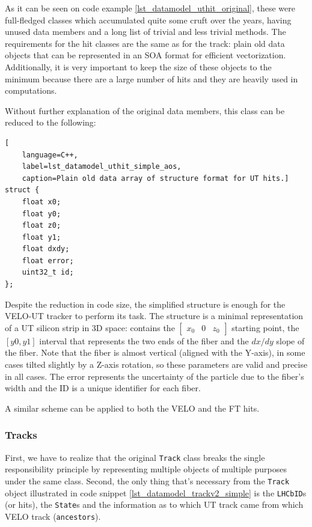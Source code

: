 \documentclass[12pt]{article}
\newcommand{\code}[1]{\texttt{#1}}
\begin{document}
As it can be seen on code example \ref{lst_datamodel_uthit_original}, these were full-fledged classes which accumulated quite some cruft over the years, having unused data members and a long list of trivial and less trivial methods. The requirements for the hit classes are the same as for the track: plain old data objects that can be represented in an SOA format for efficient vectorization. Additionally, it is very important to keep the size of these objects to the minimum because there are a large number of hits and they are heavily used in computations.

\vspace{1pc}

Without further explanation of the original data members, this class can be reduced to the following:

\begin{lstlisting}[
	language=C++,
	label=lst_datamodel_uthit_simple_aos,
	caption=Plain old data array of structure format for UT hits.]
struct {
	float x0;
	float y0;
	float z0;
	float y1;
	float dxdy;
	float error;
	uint32_t id;
};
\end{lstlisting}

Despite the reduction in code size, the simplified structure is enough for the VELO-UT tracker to perform its task. The structure is a minimal representation of a UT silicon strip in 3D space: contains the 
$\begin{bmatrix}
	x_0 & 0 & z_0
\end{bmatrix}$
starting point, the $[y0, y1]$ interval that represents the two ends of the fiber and the $dx/dy$ slope of the fiber. Note that the fiber is almost vertical (aligned with the Y-axis), in some cases tilted slightly by a Z-axis rotation, so these parameters are valid and precise in all cases. The error represents the uncertainty of the particle due to the fiber's width and the ID is a unique identifier for each fiber.

\vspace{1pc}

A similar scheme can be applied to both the VELO and the FT hits.


\subsubsection{Tracks}

First, we have to realize that the original \code{Track} class breaks the single responsibility principle by representing multiple objects of multiple purposes under the same class. Second, the only thing that's necessary from the \code{Track} object illustrated in code snippet \ref{lst_datamodel_trackv2_simple} is the \code{LHCbID}s (or hits), the \code{State}s and the information as to which UT track came from which VELO track (\code{ancestors}).
\end{document}
